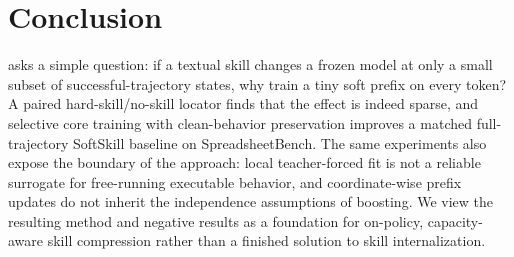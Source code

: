 \section{Conclusion}

\method asks a simple question: if a textual skill changes a frozen model at only a small subset of successful-trajectory states, why train a tiny soft prefix on every token?  A paired hard-skill/no-skill locator finds that the effect is indeed sparse, and selective core training with clean-behavior preservation improves a matched full-trajectory SoftSkill baseline on SpreadsheetBench.  The same experiments also expose the boundary of the approach: local teacher-forced fit is not a reliable surrogate for free-running executable behavior, and coordinate-wise prefix updates do not inherit the independence assumptions of boosting.  We view the resulting method and negative results as a foundation for on-policy, capacity-aware skill compression rather than a finished solution to skill internalization.
